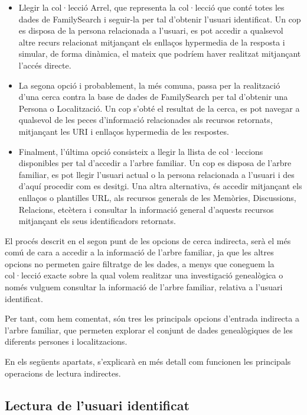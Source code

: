        \begin{itemize}
            \item Llegir la col·lecció Arrel, que representa la col·lecció que conté totes les dades de FamilySearch i seguir-la per tal d'obtenir l'usuari identificat. Un cop es disposa de la persona relacionada a l'usuari, es pot accedir a qualsevol altre recurs relacionat mitjançant els enllaços hypermedia de la resposta i simular, de forma dinàmica, el mateix que podríem haver realitzat mitjançant l'accés directe.
            \item La segona opció i probablement, la més comuna, passa per la realització d'una cerca contra la base de dades de FamilySearch per tal d'obtenir una Persona o Localització. Un cop s'obté el resultat de la cerca, es pot navegar a qualsevol de les peces d'informació relacionades als recursos retornats, mitjançant les URI i enllaços hypermedia de les respostes.
            \item Finalment, l'última opció consisteix a llegir la llista de col·leccions disponibles per tal d'accedir a l'arbre familiar. Un cop es disposa de l'arbre familiar, es pot llegir l'usuari actual o la persona relacionada a l'usuari i des d'aquí procedir com es desitgi. Una altra alternativa, és accedir mitjançant els enllaços o plantilles URL, als recursos generals de les Memòries, Discussions, Relacions, etcètera i consultar la informació general d'aquests recursos mitjançant els seus identificadors retornats.
        \end{itemize}

        El procés descrit en el segon punt de les opcions de cerca indirecta, serà el més comú de cara a accedir a la informació de l'arbre familiar, ja que les altres opcions no permeten gaire filtratge de les dades, a menys que coneguem la col·lecció exacte sobre la qual volem realitzar una investigació genealògica o només vulguem consultar la informació de l'arbre familiar, relativa a l'usuari identificat.

        Per tant, com hem comentat, són tres les principals opcions d'entrada indirecta a l'arbre familiar, que permeten explorar el conjunt de dades genealògiques de les diferents persones i localitzacions.

        En els següents apartats, s'explicarà en més detall com funcionen les principals operacions de lectura indirectes.


    \subsection{Lectura de l'usuari identificat}


